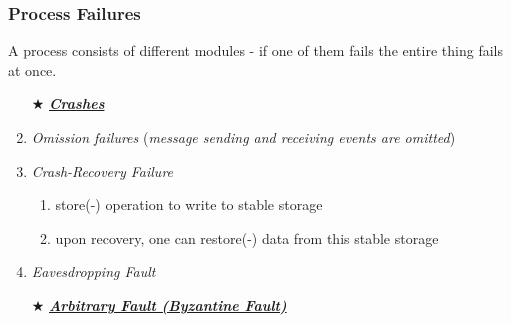 \documentclass{article}
\begin{document}
\begin{adjustwidth}{2em}{2em}
\begin{adjustwidth}{2em}{2em}
			\subsubsection{Process Failures}
			\begin{adjustwidth}{2em}{}
				A process consists of different modules - if one of them fails the entire thing fails at once.
				\begin{enumerate}[-]
					\item[$\bigstar$] \underline{\textit{\textbf{Crashes}}}
					\item \textit{Omission failures }(\textit{message sending and receiving events are omitted})
					\item \textit{Crash-Recovery Failure}
					\begin{enumerate}[\tiny{\textbullet}]
						\item store(-) operation to write to stable storage
						\item upon recovery, one can restore(-) data from this stable storage
					\end{enumerate}
					\item \textit{Eavesdropping Fault}
					\item[$\bigstar$] \underline{\textit{\textbf{Arbitrary Fault (Byzantine Fault)}}}
				\end{enumerate}
			\end{adjustwidth}
		\end{adjustwidth}

\end{adjustwidth}
\end{document}
